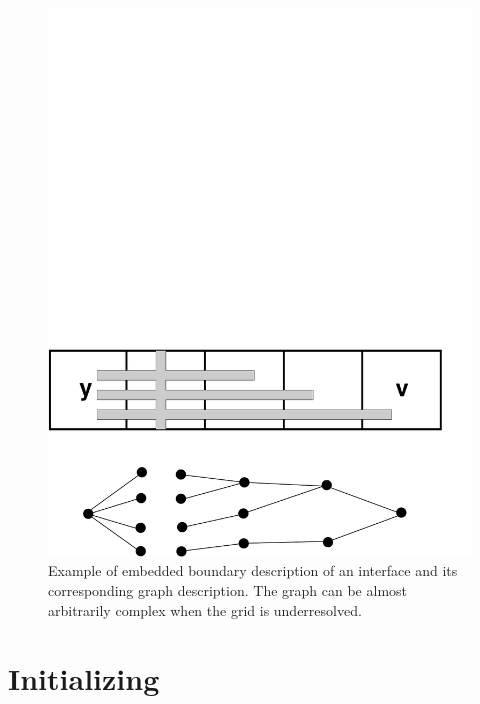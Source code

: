 \begin{figure}
  \centering
  \includegraphics[width=\textwidth]{./EB/multidivide.pdf}
\caption{\label{fig::multidivide}Example of embedded boundary description of an interface
and its corresponding graph description.  The graph
can be almost arbitrarily complex when the grid is
underresolved.}
\end{figure}


\section{Initializing \ebis}
\label{sec:EB:ebinit}

